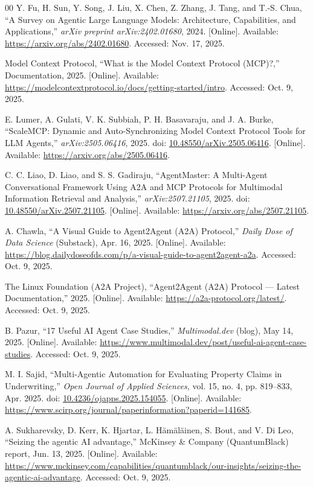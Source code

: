 \documentclass[conference]{IEEEtran}
\begin{document}
\begin{thebibliography}{00}
Y. Fu, H. Sun, Y. Song, J. Liu, X. Chen, Z. Zhang, J. Tang, and T.-S. Chua, ``A Survey on Agentic Large Language Models: Architecture, Capabilities, and Applications,'' \emph{arXiv preprint arXiv:2402.01680}, 2024. [Online]. Available: \url{https://arxiv.org/abs/2402.01680}. Accessed: Nov. 17, 2025.


Model Context Protocol, ``What is the Model Context Protocol (MCP)?,'' Documentation, 2025. [Online]. Available: \url{https://modelcontextprotocol.io/docs/getting-started/intro}. Accessed: Oct. 9, 2025.

E. Lumer, A. Gulati, V. K. Subbiah, P. H. Basavaraju, and J. A. Burke, ``ScaleMCP: Dynamic and Auto-Synchronizing Model Context Protocol Tools for LLM Agents,'' \emph{arXiv:2505.06416}, 2025. doi: \href{https://doi.org/10.48550/arXiv.2505.06416}{10.48550/arXiv.2505.06416}. [Online]. Available: \url{https://arxiv.org/abs/2505.06416}.

C. C. Liao, D. Liao, and S. S. Gadiraju, ``AgentMaster: A Multi-Agent Conversational Framework Using A2A and MCP Protocols for Multimodal Information Retrieval and Analysis,'' \emph{arXiv:2507.21105}, 2025. doi: \href{https://doi.org/10.48550/arXiv.2507.21105}{10.48550/arXiv.2507.21105}. [Online]. Available: \url{https://arxiv.org/abs/2507.21105}.


A. Chawla, ``A Visual Guide to Agent2Agent (A2A) Protocol,'' \emph{Daily Dose of Data Science} (Substack), Apr. 16, 2025. [Online]. Available: \url{https://blog.dailydoseofds.com/p/a-visual-guide-to-agent2agent-a2a}. Accessed: Oct. 9, 2025.



The Linux Foundation (A2A Project), ``Agent2Agent (A2A) Protocol --- Latest Documentation,'' 2025. [Online]. Available: \url{https://a2a-protocol.org/latest/}. Accessed: Oct. 9, 2025.

B. Pazur, ``17 Useful AI Agent Case Studies,'' \emph{Multimodal.dev} (blog), May 14, 2025. [Online]. Available: \url{https://www.multimodal.dev/post/useful-ai-agent-case-studies}. Accessed: Oct. 9, 2025.

M. I. Sajid, ``Multi-Agentic Automation for Evaluating Property Claims in Underwriting,'' \emph{Open Journal of Applied Sciences}, vol. 15, no. 4, pp. 819--833, Apr. 2025. doi: \href{https://doi.org/10.4236/ojapps.2025.154055}{10.4236/ojapps.2025.154055}. [Online]. Available: \url{https://www.scirp.org/journal/paperinformation?paperid=141685}.

A. Sukharevsky, D. Kerr, K. Hjartar, L. H\"am\"al\"ainen, S. Bout, and V. Di Leo, ``Seizing the agentic AI advantage,'' McKinsey \& Company (QuantumBlack) report, Jun. 13, 2025. [Online]. Available: \url{https://www.mckinsey.com/capabilities/quantumblack/our-insights/seizing-the-agentic-ai-advantage}. Accessed: Oct. 9, 2025.



\end{thebibliography}
\end{document}
